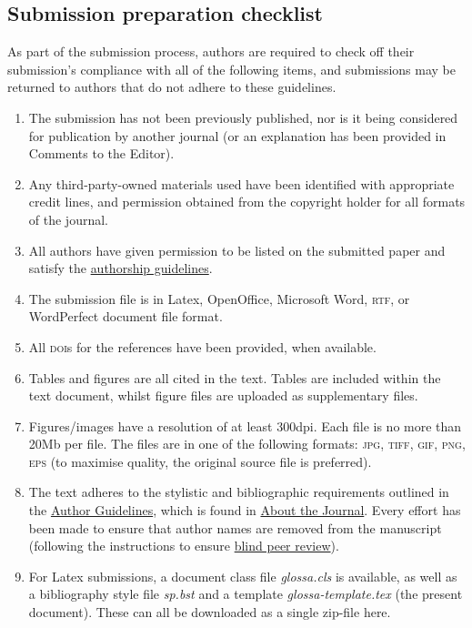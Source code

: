 \documentclass[charis,linguex,biblatex]{glossa}
\begin{document}
\subsection{Submission preparation checklist}

As part of the submission process, authors are required to check off their submission's compliance with all of the following items, and submissions may be returned to authors that do not adhere to these guidelines.

\begin{enumerate}[label=\arabic*.]
\item The submission has not been previously published, nor is it being considered for publication by another journal (or an explanation has been provided in Comments to the Editor).
\item Any third-party-owned materials used have been identified with appropriate credit lines, and permission obtained from the copyright holder for all formats of the journal.
\item All authors have given permission to be listed on the submitted paper and satisfy the \href{http://glossa.ubiquitypress.com/about/authorship/}{authorship guidelines}. 
\item The submission file is in Latex, OpenOffice, Microsoft Word, \textsc{rtf}, or WordPerfect document file format.
\item All \textsc{doi}s for the references have been provided, when available.
\item Tables and figures are all cited in the text. Tables are included within the text document, whilst figure files are uploaded as supplementary files.
\item Figures/images have a resolution of at least 300dpi. Each file is no more than 20Mb per file. The files are in one of the following formats: \textsc{jpg, tiff, gif, png, eps} (to maximise quality, the original source file is preferred).
\item The text adheres to the stylistic and bibliographic requirements outlined in the \href{http://glossa.ubiquitypress.com/about/submissions/\#authorGuidelines}{Author Guidelines}, which is found in \href{http://glossa.ubiquitypress.com/about/}{About the Journal}. Every effort has been made to ensure that author names are removed from the manuscript (following the instructions to ensure \href{http://glossa.ubiquitypress.com/help/view/editorial/topic/000044/}{blind peer review}).
\item For Latex submissions, a document class file \textit{glossa.cls} is available, as well as a bibliography style file \textit{sp.bst} and a template \textit{glossa-template.tex} (the present document). These can all be downloaded as a single zip-file here.
\end{enumerate}
\end{document}
